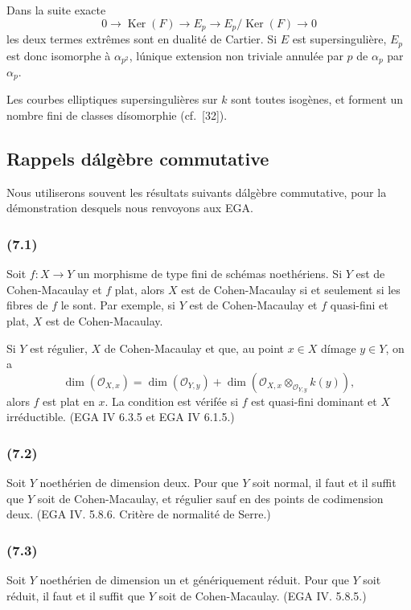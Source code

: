 \documentclass{amsart}
\theoremstyle{plain}
\theoremstyle{remark}
\DeclareMathOperator{\Ker}{Ker}
\newcommand{\cO}{\mathcal{O}}
\begin{document}
Dans la suite exacte
\[
0 \to \Ker(F) \to E_p \to E_p/\Ker(F) \to 0
\]
les deux termes extr\^emes sont en dualit\'e de Cartier. Si $E$ est supersinguli\`ere,
$E_p$ est donc isomorphe \`a $\alpha_{p^2}$, l\'unique extension non triviale annul\'ee
par $p$ de $\alpha_p$ par $\alpha_p$.

Les courbes elliptiques supersinguli\`eres sur $k$ sont toutes isog\`enes, et forment
un nombre fini de classes d\'isomorphie (cf.~[32]).

\subsection{Rappels d\'alg\`ebre commutative}

Nous utiliserons souvent les r\'esultats suivants d\'alg\`ebre commutative, pour la
d\'emonstration desquels nous renvoyons aux EGA.

\subsubsection*{(7.1)}
Soit $f: X \to Y$ un morphisme de type fini de sch\'emas noeth\'eriens. Si $Y$ est de
Cohen-Macaulay et $f$ plat, alors $X$ est de Cohen-Macaulay si et seulement si les
fibres de $f$ le sont. Par exemple, si $Y$ est de Cohen-Macaulay et $f$ quasi-fini et
plat, $X$ est de Cohen-Macaulay.

Si $Y$ est r\'egulier, $X$ de Cohen-Macaulay et que, au point $x \in X$ d\'image $y \in Y$,
on a
\begin{equation}
\dim(\cO_{X,x}) = \dim(\cO_{Y,y}) + \dim(\cO_{X,x} \otimes_{\cO_{Y,y}} k(y)),
\end{equation}
alors $f$ est plat en $x$. La condition est v\'erif\'ee si $f$ est quasi-fini dominant et
$X$ irr\'eductible. (EGA IV 6.3.5 et EGA IV 6.1.5.)

\subsubsection*{(7.2)}
Soit $Y$ noeth\'erien de dimension deux. Pour que $Y$ soit normal, il faut et il suffit
que $Y$ soit de Cohen-Macaulay, et r\'egulier sauf en des points de codimension deux.
(EGA IV. 5.8.6. Crit\`ere de normalit\'e de Serre.)

\subsubsection*{(7.3)}
Soit $Y$ noeth\'erien de dimension un et g\'en\'eriquement r\'eduit. Pour que $Y$ soit
r\'eduit, il faut et il suffit que $Y$ soit de Cohen-Macaulay. (EGA IV. 5.8.5.)
\end{document}
